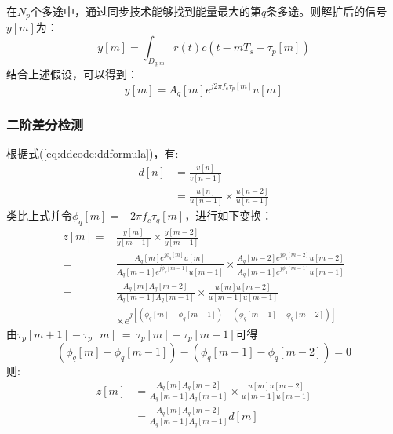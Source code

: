 	在$N_p$个多途中，通过同步技术能够找到能量最大的第$q$条多途。则解扩后的信号$y[m]$为：
\begin{equation}
	y[m]=\int_{D_{q,m}}^{}r(t)c(t-mT_s-\tau_p[m])
\end{equation}结合上述假设，可以得到\cite{liu2014long}：
\begin{equation}
	y[m]=A_q[m]e^{j2\pi f_c\tau_p[m]}u[m]
\end{equation}

\subsubsection{二阶差分检测}
	根据式(\ref{eq:ddcode:ddformula})，有:
\begin{equation}
\begin{split}
	d[n]&=\frac{v[n]}{v[n-1]} \\
	    &=\frac{u[n]}{u[n-1]}\times\frac{u[n-2]}{u[n-1]}
\end{split}
\end{equation}
类比上式并令$\phi_q[m]=-2\pi f_c \tau_q[m]$，进行如下变换：
\begin{equation}
\begin{split}
	z[m]=&\frac{y[m]}{y[m-1]}\times\frac{y[m-2]}{y[m-1]} \\
	=&\frac{A_q[m]e^{j\phi_q[m]} u[m]}{A_q[m-1]e^{j\phi_q[m-1]} u[m-1]} \times \frac{A_q[m-2]e^{j\phi_q[m-2]} u[m-2]}{A_q[m-1]e^{j\phi_q[m-1]} u[m-1]} \\
	=&\frac{A_q[m]A_q[m-2]}{A_q[m-1]A_q[m-1]}\times\frac{u[m]u[m-2]}{u[m-1]u[m-1]} \\
	&\times e^{j\left[(\phi_q[m]-\phi_q[m-1]) - (\phi_q[m-1] - \phi_q[m-2])\right]}
\end{split}
\end{equation}
由$\tau_p[m+1] -\tau_p[m]~=~\tau_p[m]-\tau_p[m-1]$可得\[ (\phi_q[m]-\phi_q[m-1]) - (\phi_q[m-1] - \phi_q[m-2]) = 0 \]则:
\begin{equation}
\begin{split}
z[m]&=\frac{A_q[m]A_q[m-2]}{A_q[m-1]A_q[m-1]}\times\frac{u[m]u[m-2]}{u[m-1]u[m-1]} \\
    &=\frac{A_q[m]A_q[m-2]}{A_q[m-1]A_q[m-1]}d[m]
\end{split}
\end{equation}




		
	